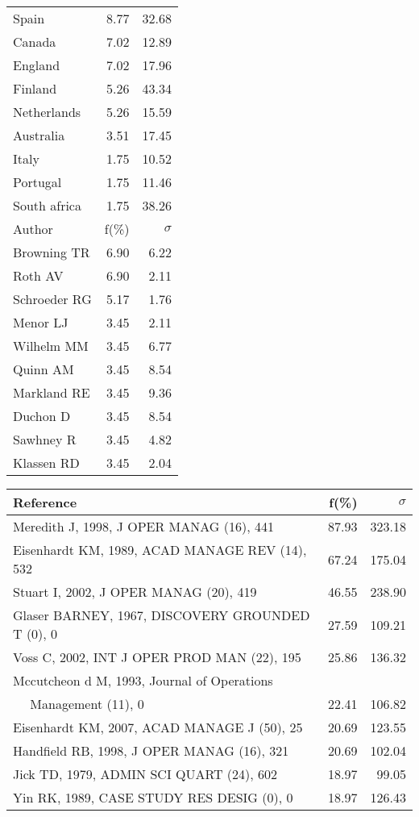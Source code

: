 \documentclass[a4paper,11pt]{report}
\begin{document}
\begin{landscape}
\begin{table}[!ht]
{\begin{tabular}{|l r r|}
Spain & 8.77 & 32.68\\
Canada & 7.02 & 12.89\\
England & 7.02 & 17.96\\
Finland & 5.26 & 43.34\\
Netherlands & 5.26 & 15.59\\
Australia & 3.51 & 17.45\\
Italy & 1.75 & 10.52\\
Portugal & 1.75 & 11.46\\
South africa & 1.75 & 38.26\\
\hline
\hline
Author & f(\%) & $\sigma$\\
\hline
Browning TR & 6.90 & 6.22\\
Roth AV & 6.90 & 2.11\\
Schroeder RG & 5.17 & 1.76\\
Menor LJ & 3.45 & 2.11\\
Wilhelm MM & 3.45 & 6.77\\
Quinn AM & 3.45 & 8.54\\
Markland RE & 3.45 & 9.36\\
Duchon D & 3.45 & 8.54\\
Sawhney R & 3.45 & 4.82\\
Klassen RD & 3.45 & 2.04\\
\hline
\end{tabular}
}
{\scriptsize\begin{tabular}{|l r r|}
\hline
Reference & f(\%) & $\sigma$\\
\hline
Meredith J, 1998, J OPER MANAG (16), 441 & 87.93 & 323.18\\
Eisenhardt KM, 1989, ACAD MANAGE REV (14), 532 & 67.24 & 175.04\\
Stuart I, 2002, J OPER MANAG (20), 419 & 46.55 & 238.90\\
Glaser BARNEY, 1967, DISCOVERY GROUNDED T (0), 0 & 27.59 & 109.21\\
Voss C, 2002, INT J OPER PROD MAN (22), 195 & 25.86 & 136.32\\
Mccutcheon d M, 1993, Journal of Operations &  & \\
$\quad$ Management (11), 0 & 22.41 & 106.82\\
Eisenhardt KM, 2007, ACAD MANAGE J (50), 25 & 20.69 & 123.55\\
Handfield RB, 1998, J OPER MANAG (16), 321 & 20.69 & 102.04\\
Jick TD, 1979, ADMIN SCI QUART (24), 602 & 18.97 & 99.05\\
Yin RK, 1989, CASE STUDY RES DESIG (0), 0 & 18.97 & 126.43\\

\end{tabular}}
\end{table}
\end{landscape}
\end{document}
